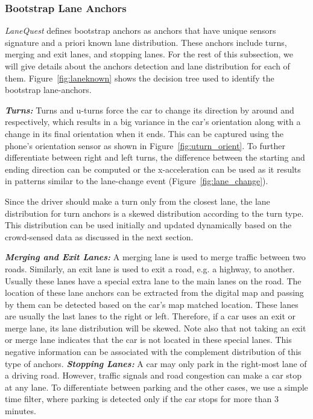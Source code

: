 \documentclass[10pt, conference, compsocconf]{IEEEtran}
\def \sys {\textit{LaneQuest}}
\begin{document}
\subsubsection{Bootstrap Lane Anchors}
\sys{} defines bootstrap anchors as anchors that have unique sensors signature and a priori known lane distribution. These anchors include turns, merging and exit lanes, and stopping lanes. For the rest of this subsection, we will give details about the anchors detection and lane distribution for each of them. Figure~\ref{fig:laneknown} shows the decision tree used to identify the bootstrap lane-anchors.

\noindent\textbf{\textit{Turns:}}
Turns and u-turns force the car to change its direction by around  and  respectively, which results in a big variance in the car's orientation along with a change in its final orientation when it ends. This can be captured using the phone's orientation sensor as shown in Figure~\ref{fig:uturn_orient}. To further differentiate between right and left turns, the difference between the starting and ending direction can be computed or the x-acceleration can be used as it results in patterns similar to the lane-change event (Figure~\ref{fig:lane_change}).

Since the driver should make a turn only from the closest lane, the lane distribution for turn anchors is a skewed distribution according to the turn type. This distribution can be used initially and updated dynamically based on the crowd-sensed data as discussed in the next section.

\noindent\textbf{\textit{Merging and Exit Lanes:}}
A merging lane is used to merge traffic between two roads. Similarly, an exit lane is used to exit a road, e.g. a highway, to another. Usually these lanes have a special extra lane to the main lanes on the road. The location of these lane anchors can be extracted from the digital map and passing by them can be detected based on the car's map matched location.  These lanes are usually the last lanes to the right or left. Therefore, if a car uses an exit or merge lane, its lane distribution will be skewed. Note also that not taking an exit or merge lane indicates that the car is not located in these special lanes. This negative information can be associated with the complement distribution of this type of anchors.
\noindent\textbf{\textit{Stopping Lanes:}}
A car may only park in the right-most lane of a driving road. However, traffic signals and road congestion can make a car stop at any lane. To differentiate between parking and the other cases, we use a simple time filter, where parking is detected only if the car stops for more than 3 minutes.
\end{document}
